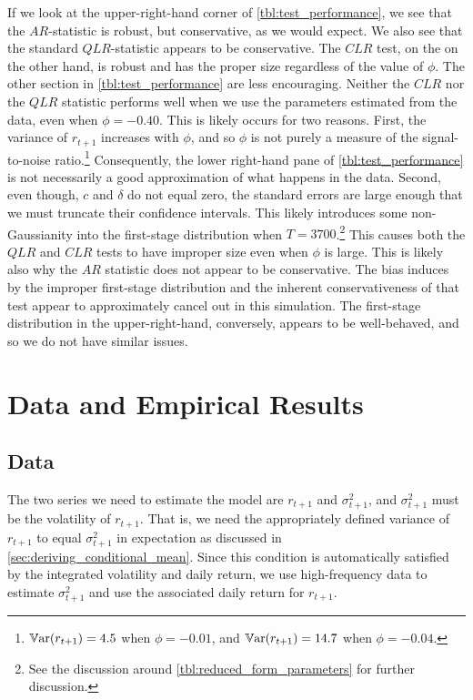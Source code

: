 \documentclass[11pt, letterpaper, twoside]{article}
\begin{document}
If we look at the upper-right-hand corner of \cref{tbl:test_performance}, we see that the $AR$-statistic is robust, but conservative, as we would expect. We also see that the standard $QLR$-statistic appears to be conservative. The $CLR$ test, on the on the other hand, is robust and has the proper size regardless of the value of $\phi$. The other section in \cref{tbl:test_performance} are less encouraging. Neither the $CLR$ nor the $QLR$ statistic performs well when we use the parameters estimated from the data, even when $\phi = -0.40$. This is likely occurs for two reasons. First,  the variance of $r_{t+1}$ increases with $\phi$, and so $\phi$ is not purely a measure of the signal-to-noise ratio.\footnote{$\operatorname{\mathbb{V}ar}(r_{t+1}) = 4.5$ when $\phi = -0.01$, and $\operatorname{\mathbb{V}ar}(r_{t+1}) = 14.7$ when $\phi = -0.04$.} Consequently, the lower right-hand pane of \cref{tbl:test_performance} is not necessarily a good approximation of what happens in the data. Second, even though, $c$ and $\delta$ do not equal zero, the standard errors are large enough that we must truncate their confidence intervals. This likely introduces some non-Gaussianity into the first-stage distribution when $T = 3700$.\footnote{See the discussion around \cref{tbl:reduced_form_parameters} for further discussion.} This causes both the $QLR$ and $CLR$ tests to have improper size even when $\phi$ is large. This is likely also why the $AR$ statistic does not appear to be conservative. The bias induces by the improper first-stage distribution and the inherent conservativeness of that test appear to approximately cancel out in this simulation.  The first-stage distribution in the upper-right-hand, conversely, appears to be well-behaved, and so we do not have similar issues.



\section{Data and Empirical Results}\label{sec:empirics}



\subsection{Data}

The two series we need to estimate the model are $r_{t+1}$ and $\sigma^2_{t+1}$, and $\sigma^2_{t+1}$ must be the volatility of $r_{t+1}$.  That is, we need the appropriately defined variance of $r_{t+1}$ to equal $\sigma^2_{t+1}$ in expectation as discussed in \cref{sec:deriving_conditional_mean}.  Since this condition is automatically satisfied by the integrated volatility and daily return, we use high-frequency data to estimate $\sigma^2_{t+1}$ and use the associated daily return for $r_{t+1}$.  
\end{document}
